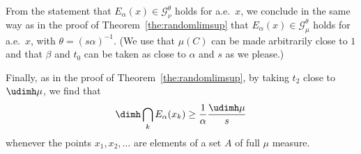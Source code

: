 From the statement that $E_\alpha (x) \in \mathscr{G}_\nu^\theta$ holds for a.e.\ $x$, we conclude in the same way as in the proof of Theorem~\ref{the:randomlimsup} that $E_\alpha (x) \in
\mathscr{G}_\mu^\theta$ holds for a.e.\ $x$, with $\theta = (s
\alpha)^{-1}$. (We use that $\mu(C)$ can be made arbitrarily close to
$1$ and that $\beta$ and $t_0$ can be taken as  close to $\alpha$ and $s$ as we please.)

Finally, as in the proof of Theorem~\ref{the:randomlimsup}, by taking $t_2$ close to $\udimh \mu$, we find that
\[
\dimh \bigcap_k E_\alpha (x_k) \geq \frac{1}{\alpha} \frac{\udimh
\mu}{s}
\]
whenever the points $x_1, x_2, \ldots$ are elements of a set $A$ of full $\mu$ measure.

